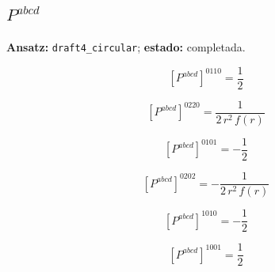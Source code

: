 \documentclass[11pt]{article}
\begin{document}
\subsection*{$ P^{abcd} $}
\textbf{Ansatz:} \texttt{draft4\_circular}; \textbf{estado:} completada.\par
\begin{dmath*}[breakdepth={5}]
\left[P^{abcd}\right]^{0110} = \frac{1}{2}
\end{dmath*}
\par\smallskip
\begin{dmath*}[breakdepth={5}]
\left[P^{abcd}\right]^{0220} = \frac{1}{2\,{r}^{2}\,f\!\left(r\right)}
\end{dmath*}
\par\smallskip
\begin{dmath*}[breakdepth={5}]
\left[P^{abcd}\right]^{0101} = -\frac{1}{2}
\end{dmath*}
\par\smallskip
\begin{dmath*}[breakdepth={5}]
\left[P^{abcd}\right]^{0202} = -\frac{1}{2\,{r}^{2}\,f\!\left(r\right)}
\end{dmath*}
\par\smallskip
\begin{dmath*}[breakdepth={5}]
\left[P^{abcd}\right]^{1010} = -\frac{1}{2}
\end{dmath*}
\par\smallskip
\begin{dmath*}[breakdepth={5}]
\left[P^{abcd}\right]^{1001} = \frac{1}{2}
\end{dmath*}
\end{document}
